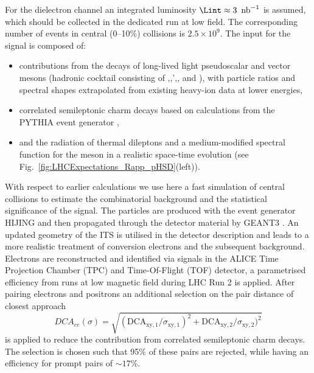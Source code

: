 \documentclass[../report.tex]{subfiles}
\begin{document}
For the dielectron channel an integrated luminosity $\Lint\approx \unit[3]{\Unb^{-1}}$ is assumed, which should be collected in the dedicated \PbPb{} run at low field. The corresponding number of events in central (0--10\%) collisions is $2.5 \times 10^{9}$.  
The input for the signal is composed of:
\begin{itemize}
\item contributions from the decays of long-lived light pseudoscalar and vector mesons (hadronic cocktail consisting of \PGpz,\PGh,\PGh',\PGo, and \PGf), with particle ratios and spectral shapes extrapolated from existing heavy-ion data at lower energies,
\item correlated semileptonic charm decays based on calculations from the PYTHIA event generator \cite{Sjostrand:2006za},
\item and the radiation of thermal dileptons and a medium-modified spectral function for the \PGr meson in a realistic space-time evolution (see Fig.~\ref{fig:LHCExpectations_Rapp_pHSD}(left)).
\end{itemize}
With respect to earlier calculations \cite{Abelevetal:2014cna,Abelevetal:2014dna,ALICE:2014qrd} we use here a fast simulation of central \PbPb{} collisions to estimate the combinatorial background and the statistical significance of the signal. The particles are produced with the event generator HIJING \cite{Wang:1991hta} and then propagated through the detector material by GEANT3 \cite{Brun:1994aa}. An updated geometry of the ITS is utilised in the detector description and leads to a more realistic treatment of conversion electrons and the subsequent background. 
Electrons are reconstructed and identified via signals in the ALICE Time Projection Chamber (TPC) and Time-Of-Flight (TOF) detector, a parametrised efficiency from runs at low magnetic field during LHC Run 2 is applied. After pairing electrons and positrons an additional selection on the pair distance of closest approach 
\begin{equation}
DCA_{ee}(\sigma)=\sqrt{(\mathrm{DCA}_{\mathrm{xy},1}/\sigma_{\mathrm{xy},1})^2+\mathrm{DCA}_{\mathrm{xy},2}/\sigma_{\mathrm{xy},2})^2}
\end{equation}
is applied to reduce the contribution from correlated semileptonic charm decays. The selection is chosen such that 95\% of these pairs are rejected, while having an efficiency for prompt pairs of $\sim17$\%.
\end{document}

